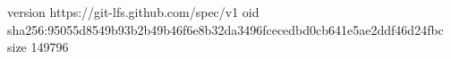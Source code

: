 version https://git-lfs.github.com/spec/v1
oid sha256:95055d8549b93b2b49b46f6e8b32da3496fcecedbd0cb641e5ae2ddf46d24fbc
size 149796
